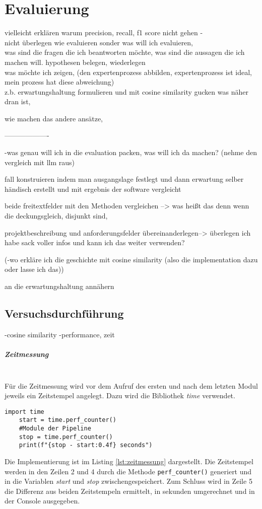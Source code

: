 \chapter{Evaluierung}
\label{chap:evaluation}

vielleicht erklären warum precision, recall, f1 score nicht gehen -\\

nicht überlegen wie evaluieren sonder was will ich evaluieren,\\
was sind die fragen die ich beantworten möchte, was sind die aussagen die ich machen will. hypothesen belegen, wiederlegen\\
was möchte ich zeigen, (den expertenprozess abbilden, expertenprozess ist ideal, mein prozess hat diese abweichung)\\

z.b. erwartungshaltung formulieren und mit cosine similarity gucken was näher dran ist,

wie machen das andere ansätze,

-------------------

-was genau will ich in die evaluation packen, was will ich da machen? (nehme den vergleich mit llm raus)

fall konstruieren indem man ausgangslage festlegt und dann erwartung selber händisch erstellt und mit ergebnis der software vergleicht

beide freitextfelder mit den Methoden vergleichen --> was heißt das denn wenn die deckungsgleich, disjunkt sind,  

projektbeschreibung und anforderungsfelder übereinanderlegen--> überlegen ich habe sack voller infos und kann ich das weiter verwenden? 

(-wo erkläre ich die geschichte mit cosine similarity (also die implementation dazu oder lasse ich das))

an die erwartungshaltung annähern

\section{Versuchsdurchführung}
-cosine similarity
-performance, zeit

\paragraph{Zeitmessung}\mbox{}\\
Für die Zeitmessung wird vor dem Aufruf des ersten und nach dem letzten Modul jeweils ein Zeitstempel angelegt. Dazu wird die Bibliothek \emph{time} verwendet.
\begin{lstlisting}[caption={Implementation der Zeitmessung}, label=lst:zeitmessung]
	import time
	start = time.perf_counter()
	#Module der Pipeline
	stop = time.perf_counter()
	print(f"{stop - start:0.4f} seconds")
\end{lstlisting}
Die Implementierung ist im Listing \ref{lst:zeitmessung} dargestellt. Die Zeitstempel werden in den Zeilen 2 und 4 durch die Methode \lstinline{perf_counter()}
generiert und in die Variablen \emph{start} und \emph{stop} zwischengespeichert. Zum Schluss wird in Zeile 5 die Differenz aus beiden Zeitstempeln ermittelt, in sekunden umgerechnet und in der Console ausgegeben.
